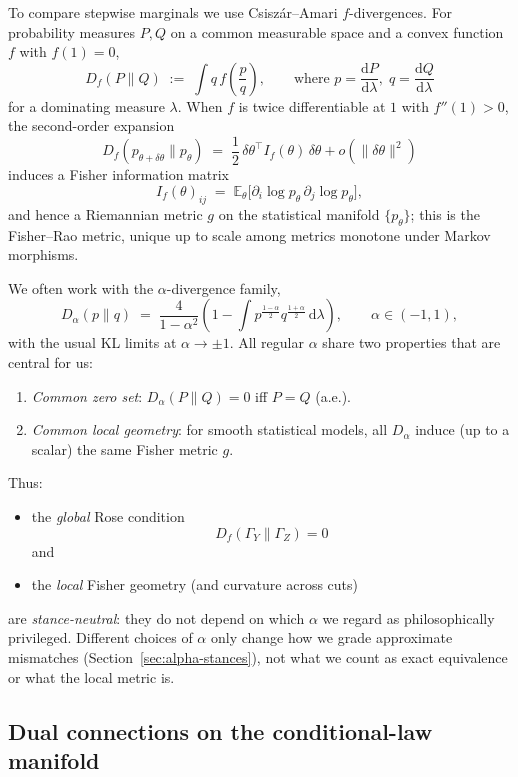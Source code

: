 \documentclass[11pt]{article}
\newcommand{\1}{\mathbf{1}}
\begin{document}
To compare stepwise marginals we use Csiszár--Amari $f$-divergences. For probability measures $P,Q$ on a common measurable space and a convex function $f$ with $f(1)=0$,
\[
  D_f(P\|Q)
  \;:=\;
  \int q\,f\!\left(\frac{p}{q}\right),
  \qquad
  \text{where } p=\frac{\mathrm d P}{\mathrm d\lambda},\;
  q=\frac{\mathrm d Q}{\mathrm d\lambda}
\]
for a dominating measure $\lambda$. When $f$ is twice differentiable at $1$ with $f''(1)>0$, the second-order expansion
\[
  D_f(p_{\theta+\delta\theta}\|p_\theta)
  \;=\;
  \frac{1}{2}\,\delta\theta^\top I_f(\theta)\,\delta\theta
  + o(\|\delta\theta\|^2)
\]
induces a Fisher information matrix
\[
  I_f(\theta)_{ij}
  \;=\;
  \mathbb{E}_\theta\big[ \partial_i\log p_\theta\,\partial_j\log p_\theta\big],
\]
and hence a Riemannian metric $g$ on the statistical manifold $\{p_\theta\}$; this is the Fisher--Rao metric, unique up to scale among metrics monotone under Markov morphisms.

We often work with the $\alpha$-divergence family,
\[
D_\alpha(p\|q)
\;=\;
\frac{4}{1-\alpha^2}
\left(
1 - \int p^{\frac{1-\alpha}{2}} q^{\frac{1+\alpha}{2}}\,\mathrm d\lambda
\right),
\qquad \alpha\in(-1,1),
\]
with the usual KL limits at $\alpha\to \pm 1$. All regular $\alpha$ share two properties that are central for us:
\begin{enumerate}[leftmargin=1.5em]
  \item \emph{Common zero set}: $D_\alpha(P\|Q)=0$ iff $P=Q$ (a.e.).
  \item \emph{Common local geometry}: for smooth statistical models, all $D_\alpha$ induce (up to a scalar) the same Fisher metric $g$.
\end{enumerate}

Thus:
\begin{itemize}[leftmargin=1.5em]
  \item the \emph{global} Rose condition
  \[
    D_f(\Gamma_Y\|\Gamma_Z)=0
  \]
  and
  \item the \emph{local} Fisher geometry (and curvature across cuts)
\end{itemize}
are \emph{stance-neutral}: they do not depend on which $\alpha$ we regard as philosophically privileged. Different choices of $\alpha$ only change how we grade approximate mismatches (Section~\ref{sec:alpha-stances}), not what we count as exact equivalence or what the local metric is.

\subsection{Dual connections on the conditional-law manifold}
\label{subsec:dual-connections}
\end{document}
